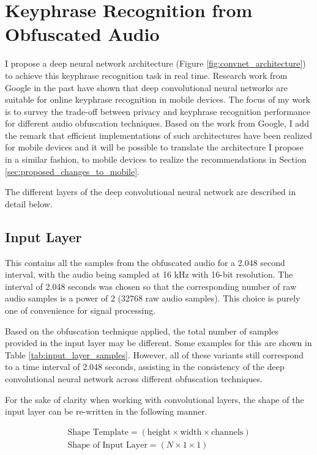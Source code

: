 
\section{Keyphrase Recognition from Obfuscated Audio}
\label{sec:recognition_models}

I propose a deep neural network architecture (Figure \ref{fig:convnet_architecture}) to achieve this keyphrase recognition task in real time.
 Research work from Google in the past \cite{smallfootprintkeywordspotting} \cite{cnnkeywordspotting} \cite{chen2015locallyconnected} \cite{chen2014low} have shown that deep convolutional neural networks are suitable for online keyphrase recognition in mobile devices.
 The focus of my work is to survey the trade-off between privacy and keyphrase recognition performance for different audio obfuscation techniques.
 Based on the work from Google, I add the remark that efficient implementations of such architectures have been realized for mobile devices and it will be possible to translate the architecture I propose in a similar fashion, to mobile devices to realize the recommendations in Section \ref{sec:proposed_changes_to_mobile}.

The different layers of the deep convolutional neural network are described in detail below.

\subsection{Input Layer}

This contains all the samples from the obfuscated audio for a 2.048 second interval, with the audio being sampled at 16 kHz with 16-bit resolution.
 The interval of 2.048 seconds was chosen so that the corresponding number of raw audio samples is a power of 2 (32768 raw audio samples).
 This choice is purely one of convenience for signal processing.


Based on the obfuscation technique applied, the total number of samples provided in the input layer may be different.
 Some examples for this are shown in Table \ref{tab:input_layer_samples}.
 However, all of these variants still correspond to a time interval of 2.048 seconds, assisting in the consistency of the deep convolutional neural network across different obfuscation techniques.


For the sake of clarity when working with convolutional layers, the shape of the input layer can be re-written in the following manner.

\begin{gather}
\text{Shape Template} = (\text{height} \times \text{width} \times \text{channels}) \\
\text{Shape of Input Layer} = (N \times 1 \times 1)
\end{gather}


